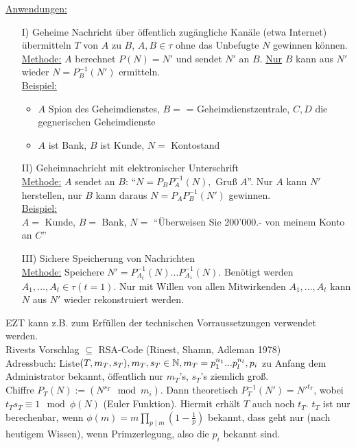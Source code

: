 \documentclass[a4paper,DIV15,BCOR12mm]{article}
\begin{document}
\underline{Anwendungen:}\\
\begin{itemize}
    \item[I)] Geheime Nachricht über öffentlich  zugängliche Kanäle (etwa Internet) übermitteln $T$ von $A$ zu $B$, $A,B \in \tau$ ohne das Unbefugte $N$ gewinnen können.\\
        \underline{Methode:} $A$ berechnet $P(N) = N'$ und sendet $N'$ an $B$. \underline{Nur} $B$ kann aus $N'$ wieder $N = P_B^{-1}(N')$ ermitteln.\\
        \underline{Beispiel:}\\
            \begin{itemize}
                \item $A$ Spion des Geheimdienstes, $B =$ = Geheimdienstzentrale, $C,D$ die gegnerischen Geheimdienste
                \item $A$ ist Bank, $B$ ist Kunde, $N =$ Kontostand
            \end{itemize}
    \item[II)] Geheimnachricht mit elektronischer Unterschrift\\
        \underline{Methode:} $A$ sendet an $B$: "`$N = P_BP_A^{-1}(N), \text { Gruß }A$"'. Nur $A$ kann $N'$ herstellen, nur $B$ kann daraus $N = P_AP_B^{-1}(N')$ gewinnen.\\
        \underline{Beispiel:}\\
            $A =$ Kunde, $B =$ Bank, $N =$ "`Überweisen Sie 200'000.- von meinem Konto an $C$"'
    \item[III)] Sichere Speicherung von Nachrichten\\
        \underline{Methode:} Speichere $N' = P_{A_t}^{-1}(N)...P_{A_1}^{-1}(N)$. Benötigt werden $A_1,..., A_t \in \tau (t = 1)$. Nur mit Willen von allen Mitwirkenden $A_1,..., A_t$ kann $N$ aus $N'$ wieder rekonstruiert werden.
\end{itemize}

EZT kann z.B. zum Erfüllen der technischen Vorraussetzungen verwendet werden.\\
Rivests Vorschlag $\subseteq$ RSA-Code (Rinest, Shamn, Adleman 1978)\\
Adressbuch: Liste$(T, m_T, s_T), m_T, s_T \in \mathbb{N}, m_T = p_1^{n_1}...p_l^{n_l}, p_i$ zu Anfang dem Administrator bekannt, öffentlich nur $m_T$'s, $s_T$'s ziemlich groß.\\
Chiffre $P_T(N) := (N^{s_T} \mod m_i)$. Dann theoretisch
$P_T^{-1}(N') = N'^{t_T}$, wobei $t_Ts_T \equiv 1 \mod \phi(N)$
(Euler Funktion). Hiermit erhält $T$ auch noch $t_T$. $t_T$ ist nur
berechenbar, wenn $\phi(m) = m\prod_{p \mid m}(1-\frac{1}{p})$
bekannt, dass geht nur (nach heutigem Wissen), wenn Primzerlegung,
also die $p_i$ bekannt sind.
\end{document}
